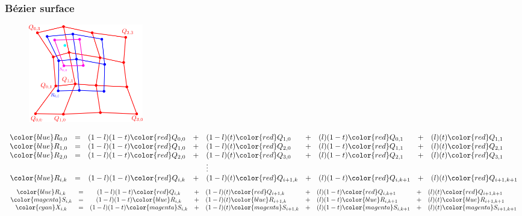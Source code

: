 \begin{frame}
\frametitle{Bézier surface}
  \begin{figure}[h]
  \includegraphics[width=5cm,keepaspectratio]{pics/bezier/bezier3}
  \end{figure}
  {\tiny
  \[
  \begin{array}{ccclllllll}
    {\color{blue}R_{0,0}} &=& (1-l)(1-t){\color{red}Q_{0,0}} &+& (1-l)(t){\color{red}Q_{1,0}}   &+& (l)(1-t){\color{red}Q_{0,1}}   &+& (l)(t){\color{red}Q_{1,1}} \\
    {\color{blue}R_{1,0}} &=& (1-l)(1-t){\color{red}Q_{1,0}} &+& (1-l)(t){\color{red}Q_{2,0}}   &+& (l)(1-t){\color{red}Q_{1,1}}   &+& (l)(t){\color{red}Q_{2,1}} \\
    {\color{blue}R_{2,0}} &=& (1-l)(1-t){\color{red}Q_{2,0}} &+& (1-l)(t){\color{red}Q_{3,0}}   &+& (l)(1-t){\color{red}Q_{2,1}}   &+& (l)(t){\color{red}Q_{3,1}} \\
                         &&&&\vdots &&&& \\
    {\color{blue}R_{i,k}} &=& (1-l)(1-t){\color{red}Q_{i,k}} &+& (1-l)(t){\color{red}Q_{i+1,k}} &+& (l)(1-t){\color{red}Q_{i,k+1}} &+& (l)(t){\color{red}Q_{i+1,k+1}} \\
  \end{array}
  \]
  }
  {\tiny
  \[
  \begin{array}{ccclllllll}
    {\color{blue}R_{i,k}} &=& (1-l)(1-t){\color{red}Q_{i,k}} &+& (1-l)(t){\color{red}Q_{i+1,k}} &+& (l)(1-t){\color{red}Q_{i,k+1}} &+& (l)(t){\color{red}Q_{i+1,k+1}}        \\
    {\color{magenta}S_{i,k}} &=& (1-l)(1-t){\color{blue}R_{i,k}} &+& (1-l)(t){\color{blue}R_{i+1,k}} &+& (l)(1-t){\color{blue}R_{i,k+1}} &+& (l)(t){\color{blue}R_{i+1,k+1}} \\
    {\color{cyan}X_{i,k}} &=& (1-l)(1-t){\color{magenta}S_{i,k}} &+& (1-l)(t){\color{magenta}S_{i+1,k}} &+& (l)(1-t){\color{magenta}S_{i,k+1}} &+& (l)(t){\color{magenta}S_{i+1,k+1}}
  \end{array}
  \]
  }
\end{frame}


